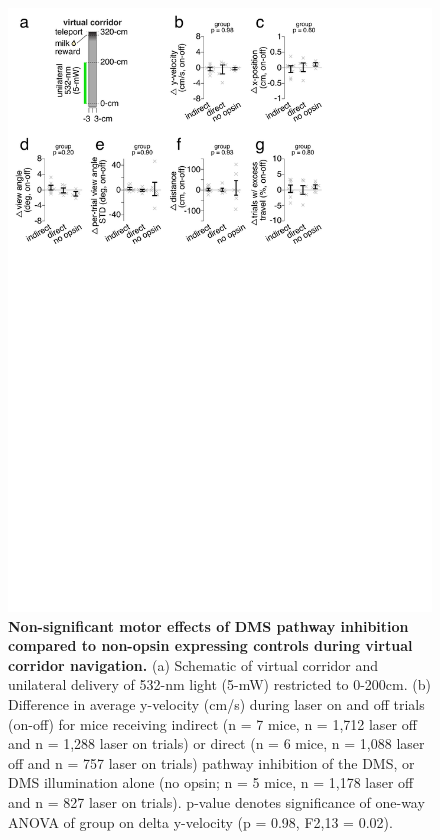 \begin{figure}[t!]
\vspace{-2.5cm}
  \begin{center}
    \includegraphics[width=0.90\linewidth]{ch7-appendix1/appendix1-figures/ExtData_Fig2.pdf}
    \caption[Non-significant motor effects of DMS pathway inhibition compared to non-opsin expressing controls during virtual corridor navigation]{\textbf{Non-significant motor effects of DMS pathway inhibition compared to non-opsin expressing controls during virtual corridor navigation.} (a) Schematic of virtual corridor and unilateral delivery of 532-nm light (5-mW) restricted to 0-200cm. (b) Difference in average y-velocity (cm/s) during laser on and off trials (on-off) for mice receiving indirect (n = 7 mice, n = 1,712 laser off and n = 1,288 laser on trials) or direct (n = 6 mice, n = 1,088 laser off and n = 757 laser on trials) pathway inhibition of the DMS, or DMS illumination alone (no opsin; n = 5 mice, n = 1,178 laser off and n = 827 laser on trials). p-value denotes significance of one-way ANOVA of group on delta y-velocity (p = 0.98, F2,13 = 0.02). }
    \label{fig:ap1:ext2}
  \end{center}
  \vspace{-1.5cm}
\end{figure}
